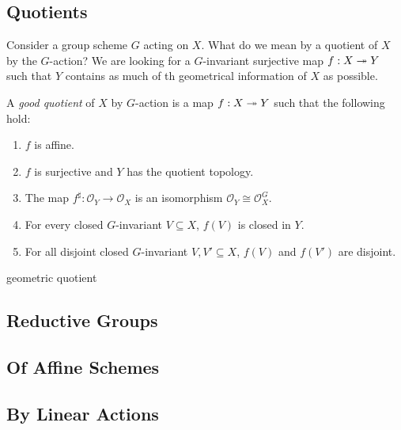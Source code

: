 \documentclass[12pt]{ociamthesis}  %
\begin{document}
\begin{example}
  \missingexample
\end{example}

\subsection{Quotients}

Consider a group scheme $G$ acting on $X$. What do we mean by a
quotient of $X$ by the $G$-action? We are looking for a $G$-invariant
surjective map $f : X\twoheadrightarrow Y$ such that $Y$ contains as much of th
geometrical information of $X$ as possible.


\begin{definition}
  A \emph{good quotient} of $X$ by $G$-action is a map
  $f : X\twoheadrightarrow Y$ such that the following hold:
  \begin{enumerate}
    \item $f$ is affine.
    \item $f$ is surjective and $Y$ has the quotient topology.
    \item The map $f^\sharp : \mathcal O_Y \to \mathcal O_X$
      is an isomorphism $\mathcal O_Y \cong \mathcal O_X^G$.
    \item For every closed $G$-invariant $V\subseteq X$,
      $f(V)$ is closed in $Y$.
    \item For all disjoint closed $G$-invariant $V,V'\subseteq X$,
      $f(V)$ and $f(V')$ are disjoint.
  \end{enumerate}
\end{definition}

\begin{definition}
  geometric quotient
\end{definition}

\subsection{Reductive Groups}

\missingsection

\subsection{Of Affine Schemes}

\missingsection

\subsection{By Linear Actions}
\end{document}
